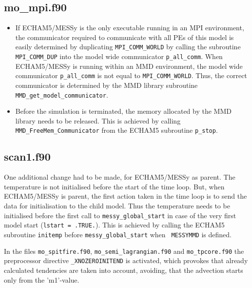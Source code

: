 \documentclass[11pt,twoside]{article}
\begin{document}
\subsection{mo\_mpi.f90}
\begin{itemize}
\item If ECHAM5/MESSy is the only executable running in an MPI environment, 
the communicator required to communicate with all PEs of this model is easily 
determined
by duplicating \verb|MPI_COMM_WORLD| by calling the subroutine 
\verb|MPI_COMM_DUP| into the model wide communicator \verb|p_all_comm|.
When ECHAM5/MESSy
 is running within an MMD environment, the model wide communicator
 \verb|p_all_comm| is not equal to  \verb|MPI_COMM_WORLD|. Thus, 
the correct communicator is determined by the MMD library subroutine 
\verb|MMD_get_model_communicator|.
\item Before the simulation is terminated, the memory allocated by the MMD 
library needs to be released.  This is achieved by calling 
\verb|MMD_FreeMem_Communicator| from 
the ECHAM5 subroutine \verb|p_stop|.
\end{itemize}

\subsection{scan1.f90}
One additional change had to be made, for ECHAM5/MESSy as parent. 
The temperature
is not initialised before the start of the time loop. But, when ECHAM5/MESSy is
parent, the first action taken in the time loop is to send the data for 
initialisation to the child model. Thus the temperature needs to be initialised
before the first call to \verb|messy_global_start| in case of the very first
model start (\verb|lstart = .TRUE.|). This is achieved by calling the ECHAM5
subroutine \verb|initemp| before \verb|messy_global_start| when {\tt \large
MESSYMMD} is defined.

In the files \verb|mo_spitfire.f90|, \verb|mo_semi_lagrangian.f90| and 
\verb|mo_tpcore.f90| the preprocessor directive
{\tt \large  \_XNOZEROINITEND} is activated, which provokes that
already calculated tendencies are taken into account, avoiding, that
the advection starts only from the 'm1'-value.
\end{document}
